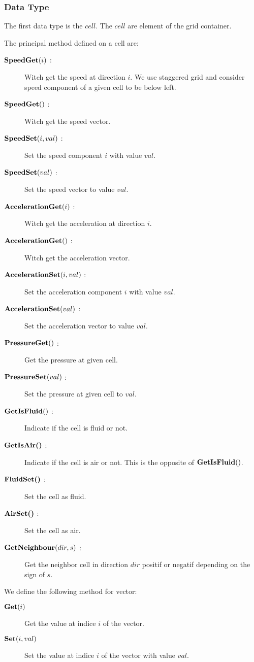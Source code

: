 \subsubsection{Data Type}

The first data type is the $cell$. The $cell$ are element of the grid container.

The principal method defined on a cell are:
\begin{description}
 \item[$\mathop{\textbf{SpeedGet}}(i)$ :] Witch get the speed at direction $i$. We use staggered grid and consider speed component of a given cell
 to be below left.
  \item[$\mathop{\textbf{SpeedGet}}()$ :] Witch get the speed vector.
 \item[$\mathop{\textbf{SpeedSet}}(i,val)$ :] Set the speed component $i$ with value $val$.
 \item[$\mathop{\textbf{SpeedSet}}(val)$ :] Set the speed vector to value $val$.
 \item[$\mathop{\textbf{AccelerationGet}}(i)$ :] Witch get the acceleration at direction $i$.
 \item[$\mathop{\textbf{AccelerationGet}}()$ :] Witch get the acceleration vector.
 \item[$\mathop{\textbf{AccelerationSet}}(i,val)$ :] Set the acceleration component $i$ with value $val$.
 \item[$\mathop{\textbf{AccelerationSet}}(val)$ :] Set the acceleration vector to value $val$.
 \item[$\mathop{\textbf{PressureGet}}()$ :] Get the pressure at given cell.
 \item[$\mathop{\textbf{PressureSet}}(val)$ :] Set the pressure at given cell to $val$.
 \item[$\mathop{\textbf{GetIsFluid}}()$ :] Indicate if the cell is fluid or not.
 \item[$\mathop{\textbf{GetIsAir()}}$ :] Indicate if the cell is air or not. This is the opposite of $\mathop{\textbf{GetIsFluid}}()$.
 \item[$\mathop{\textbf{FluidSet()}}$ :] Set the cell as fluid.
 \item[$\mathop{\textbf{AirSet()}}$ :] Set the cell as air.
 \item[$\mathop{\textbf{GetNeighbour}}(dir,s)$ :] Get the neighbor cell in direction $dir$ positif or negatif depending on the sign of $s$.
\end{description}

We define the following method for vector:
\begin{description}
 \item[$\mathop{\textbf{Get}}(i)$] Get the value at indice $i$ of the vector.
  \item[$\mathop{\textbf{Set}}(i,val)$] Set the value at indice $i$ of the vector with value $val$.
\end{description}

